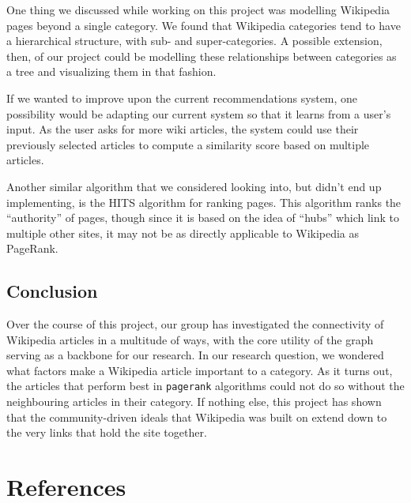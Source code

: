 \documentclass[fontsize=11pt]{article}
\begin{document}
One thing we discussed while working on this project was modelling Wikipedia pages beyond a single category. We found that Wikipedia categories tend to have a hierarchical structure, with sub- and super-categories. A possible extension, then, of our project could be modelling these relationships between categories as a tree and visualizing them in that fashion.

If we wanted to improve upon the current recommendations system, one possibility would be adapting our current system so that it learns from a user's input. As the user asks for more wiki articles, the system could use their previously selected articles to compute a similarity score based on multiple articles.

Another similar algorithm that we considered looking into, but didn't end up implementing, is the HITS algorithm for ranking pages. This algorithm ranks the ``authority'' of pages, though since it is based on the idea of ``hubs'' which link to multiple other sites, it may not be as directly applicable to Wikipedia as PageRank.

\subsection{Conclusion}

Over the course of this project, our group has investigated the connectivity of Wikipedia articles in a multitude of ways, with the core utility of the graph serving as a backbone for our research. In our research question, we wondered what factors make a Wikipedia article important to a category. As it turns out, the articles that perform best in \texttt{pagerank} algorithms could not do so without the neighbouring articles in their category. If nothing else, this project has shown that the community-driven ideals that Wikipedia was built on extend down to the very links that hold the site together.


\newpage

\section*{References}

\end{document}

